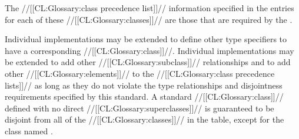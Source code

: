 The //[[CL:Glossary:class precedence list]]// information specified in the entries for
each of these //[[CL:Glossary:classes]]// are those that are required by the \OS.

Individual implementations may be extended to define other type
specifiers to have a corresponding //[[CL:Glossary:class]]//.  Individual implementations
may be extended to add other //[[CL:Glossary:subclass]]// relationships and to add other
//[[CL:Glossary:elements]]// to the //[[CL:Glossary:class precedence lists]]// as long as
they do not violate the type relationships and disjointness
requirements specified by this standard.
A standard //[[CL:Glossary:class]]// defined with no direct //[[CL:Glossary:superclasses]]// is guaranteed to
be disjoint from all of the //[[CL:Glossary:classes]]// in the table, except for the
class named .
 
\endsubSection%
